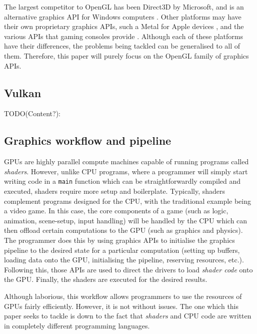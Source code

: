 \documentclass[a4paper,12pt,twoside,openright]{report}
\begin{document}
The largest competitor to OpenGL has been Direct3D by Microsoft, and is an
alternative graphics API for Windows computers \cite{TODO}. Other platforms may
have their own proprietary graphics APIs, such a Metal for Apple devices
\cite{TODO}, and the various APIs that gaming consoles provide \cite{TODO}.
Although each of these platforms have their differences, the problems being
tackled can be generalised to all of them. Therefore, this paper will purely
focus on the OpenGL family of graphics APIs.

\subsection{Vulkan}

TODO(Content?):

\subsection{Graphics workflow and pipeline}

GPUs are highly parallel compute machines capable of running programs called
\textit{shaders}. However, unlike CPU programs, where a programmer will simply
start writing code in a \texttt{main} function which can be straightforwardly
compiled and executed, shaders require more setup and boilerplate. Typically,
shaders complement programs designed for the CPU, with the traditional example
being a video game. In this case, the core components of a game (such as logic,
animation, scene-setup, input handling) will be handled by the CPU which can
then offload certain computations to the GPU (such as graphics and physics).
The programmer does this by using graphics APIs to initialise the graphics
pipeline to the desired state for a particular computation (setting up buffers,
loading data onto the GPU, initialising the pipeline, reserving resources,
etc.). Following this, those APIs are used to direct the drivers to load
\textit{shader code} onto the GPU. Finally, the shaders are executed for the
desired results.

Although laborious, this workflow allows programmers to use the resources of
GPUs fairly efficiently. However, it is not without issues. The one which this
paper seeks to tackle is down to the fact that \textit{shaders} and CPU code
are written in completely different programming languages.
\end{document}
